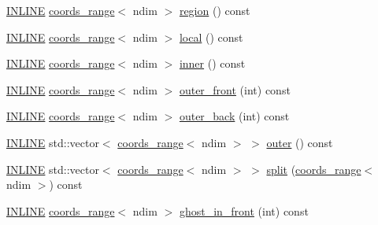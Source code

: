 \begin{DoxyCompactItemize}
\item 
\hyperlink{common_8hpp_a2eb6f9e0395b47b8d5e3eeae4fe0c116}{I\+N\+L\+I\+NE} \hyperlink{structshark_1_1ndim_1_1coords__range}{coords\+\_\+range}$<$ ndim $>$ \hyperlink{classshark_1_1ndim_1_1_global_array_a40939e7384b55a49b59c63dc717224d2}{region} () const
\item 
\hyperlink{common_8hpp_a2eb6f9e0395b47b8d5e3eeae4fe0c116}{I\+N\+L\+I\+NE} \hyperlink{structshark_1_1ndim_1_1coords__range}{coords\+\_\+range}$<$ ndim $>$ \hyperlink{classshark_1_1ndim_1_1_global_array_a871fb1acbd9bd46439766121053e20d1}{local} () const
\item 
\hyperlink{common_8hpp_a2eb6f9e0395b47b8d5e3eeae4fe0c116}{I\+N\+L\+I\+NE} \hyperlink{structshark_1_1ndim_1_1coords__range}{coords\+\_\+range}$<$ ndim $>$ \hyperlink{classshark_1_1ndim_1_1_global_array_a9bba546920e1709b492540d4ef0b0129}{inner} () const
\item 
\hyperlink{common_8hpp_a2eb6f9e0395b47b8d5e3eeae4fe0c116}{I\+N\+L\+I\+NE} \hyperlink{structshark_1_1ndim_1_1coords__range}{coords\+\_\+range}$<$ ndim $>$ \hyperlink{classshark_1_1ndim_1_1_global_array_a991cfff5cda18b938bc52cfc1c383680}{outer\+\_\+front} (int) const
\item 
\hyperlink{common_8hpp_a2eb6f9e0395b47b8d5e3eeae4fe0c116}{I\+N\+L\+I\+NE} \hyperlink{structshark_1_1ndim_1_1coords__range}{coords\+\_\+range}$<$ ndim $>$ \hyperlink{classshark_1_1ndim_1_1_global_array_a6f07daf32776f286cffa8620a456a3cd}{outer\+\_\+back} (int) const
\item 
\hyperlink{common_8hpp_a2eb6f9e0395b47b8d5e3eeae4fe0c116}{I\+N\+L\+I\+NE} std\+::vector$<$ \hyperlink{structshark_1_1ndim_1_1coords__range}{coords\+\_\+range}$<$ ndim $>$ $>$ \hyperlink{classshark_1_1ndim_1_1_global_array_a93f43e778ca040cb2ca8ad05dcb02ab0}{outer} () const
\item 
\hyperlink{common_8hpp_a2eb6f9e0395b47b8d5e3eeae4fe0c116}{I\+N\+L\+I\+NE} std\+::vector$<$ \hyperlink{structshark_1_1ndim_1_1coords__range}{coords\+\_\+range}$<$ ndim $>$ $>$ \hyperlink{classshark_1_1ndim_1_1_global_array_a9c72fd2f409389cb47a6f47bdfb77582}{split} (\hyperlink{structshark_1_1ndim_1_1coords__range}{coords\+\_\+range}$<$ ndim $>$) const
\item 
\hyperlink{common_8hpp_a2eb6f9e0395b47b8d5e3eeae4fe0c116}{I\+N\+L\+I\+NE} \hyperlink{structshark_1_1ndim_1_1coords__range}{coords\+\_\+range}$<$ ndim $>$ \hyperlink{classshark_1_1ndim_1_1_global_array_a8432959070aee7062f09cae8e7f20097}{ghost\+\_\+in\+\_\+front} (int) const
\item 

\end{DoxyCompactItemize}
